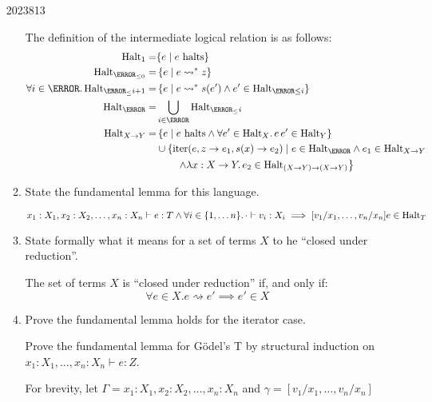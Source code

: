 \documentclass[10pt,\jkfside,a4paper]{article}
\begin{document}
\begin{enumerate}
\begin{examquestion}{2023}{8}{13}
\begin{enumerate}[label=$(\alph*)$]
            The definition of the intermediate logical relation is as follows:
            \begin{align*}
                \mathrm{Halt}_1 =& \{e \mid e\ \mathrm{halts}\} \\
                \mathrm{Halt}_{\N_{\le 0}} =& \left\{e \mid e \rightsquigarrow^* z\right\} \\
                \forall i \in \N \ldotp \mathrm{Halt}_{\N_\le i+1} =& \left\{e \mid e \rightsquigarrow^* s(e') \land e' \in \mathrm{Halt}_{\N \le i}\right\} \\
                \mathrm{Halt}_{\N} =& \bigcup_{i \in \N} \mathrm{Halt}_{\N_\le i} \\
                \mathrm{Halt}_{X \to Y} =& \left\{e \mid e\ \mathrm{halts} \land \forall e' \in \mathrm{Halt}_X \ldotp e\, e' \in \mathrm{Halt}_Y\right\} \\
                &\cup \left\{\mathrm{iter}(e, z \to e_1, s(x) \to e_2) \mid e \in \mathrm{Halt}_\N \land e_1 \in \mathrm{Halt}_{X \to Y} \right. \\
                &\qquad \left.\land \lambda x: X \to Y \ldotp e_2 \in \mathrm{Halt}_{(X \to Y) \to (X \to Y)}\right\}\\
            \end{align*}

            \item State the fundamental lemma for this language.

            \[
                x_1: X_1, x_2: X_2, \ldots, x_n: X_n \vdash e: T \land \forall i \in \{1, \ldots n\}\ldotp \cdot \vdash v_i: X_i \implies [v_1/x_1, \ldots, v_n / x_n]e \in \mathrm{Halt}_T
            \]

            \item State formally what it means for a set of terms $X$ to he ``closed under reduction''.

            The set of terms $X$ is ``closed under reduction'' if, and only if:
            \[
                \forall e \in X. e \rightsquigarrow e' \implies e' \in X
            \]

            \item Prove the fundamental lemma holds for the iterator case.

            Prove the fundamental lemma for G\"odel's T by structural induction on $x_1: X_1, \ldots, x_n: X_n \vdash e: Z$.

            For brevity, let $\Gamma = x_1: X_1, x_2: X_2, \ldots, x_n: X_n$ and $\gamma = [v_1/x_1, \ldots, v_n / x_n]$


\end{enumerate}
\end{examquestion}
\end{enumerate}
\end{document}

